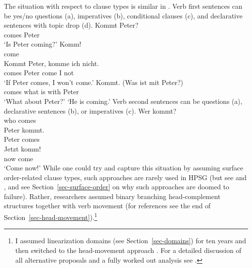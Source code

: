 \documentclass[output=paper
                ,modfonts
                ,nonflat
	        ,collection
	        ,collectionchapter
	        ,collectiontoclongg
 	        ,biblatex
                ,babelshorthands
                ,newtxmath
                ,draftmode
                ,colorlinks, citecolor=brown
]{./langsci/langscibook}
\begin{document}
The situation with respect to clause types is similar in . Verb first sentences can be yes/no
questions (a), imperatives (b), conditional clauses (c), and declarative
sentences with topic drop (d). 
\eal
\ex\label{ex-kommt-peter-question}
\gll Kommt Peter?\\
     comes Peter\\\german
\glt `Is Peter coming?'
\ex 
\gll Komm!\\
     come\\
\ex\label{ex-kommt-peter-conditional}
\gll Kommt Peter, komme ich nicht.\\
     comes Peter  come  I not\\
\glt `If Peter comes, I won't come.'
\ex 
\gll Kommt. (Was ist mit Peter?)\\
     comes  what is with Peter\\
\glt `What about Peter?' `He is coming.'
\zl
Verb second sentences can be questions (a), declarative sentences (b), or imperatives (c).
\eal
\ex 
\gll Wer kommt?\\
     who comes\\\german
\ex 
\gll Peter kommt.\\
     Peter comes\\
\ex 
\gll Jetzt komm!\\
     now   come\\
\glt `Come now!'
\zl
While one could try and capture this situation by assuming surface order-related clause types, such approaches are rarely
used in HPSG (but see  and , and see Section~\ref{sec-surface-order} on why such approaches
are doomed to failure). Rather, researchers assumed binary branching head-complement structures
together with verb movement (for references see the end of
Section~\ref{sec-head-movement}).\footnote{%
I assumed linearization domains (see Section~\ref{sec-domains}) for ten
years and then switched to the head-movement approach
\citep{Mueller2005c,Mueller2005d,MuellerGS}. For a detailed discussion of all alternative proposals
and a fully worked out analysis see .%
} 
\end{document}
